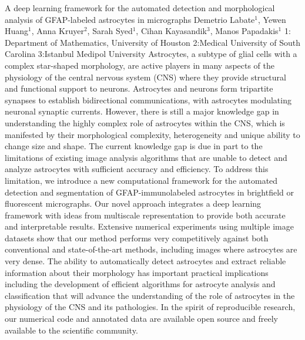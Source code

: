 \vspace{1.5ex}
\abs
{A deep learning framework for the automated detection and morphological analysis of GFAP-labeled astrocytes in micrographs}
{Demetrio Labate$^{1}$, Yewen Huang$^{1}$, Anna Kruyer$^{2}$, Sarah Syed$^{1}$, Cihan Kayasandik$^{3}$, Manos Papadakis$^{1}$}
{1: Department of Mathematics, University of Houston 2:Medical University of South Carolina 3:Istanbul Medipol University}
{Astrocytes, a subtype of glial cells with a complex star-shaped morphology, are active players in many aspects of the physiology of the central nervous system (CNS) where they provide structural and functional support to neurons. Astrocytes and neurons form tripartite synapses to establish bidirectional communications, with astrocytes modulating neuronal synaptic currents. However, there is still a major knowledge gap in understanding the highly complex role of astrocytes within the CNS, which is manifested by their morphological complexity, heterogeneity and unique ability to change size and shape. The current knowledge gap is due in part to the limitations of existing image analysis algorithms that are unable to detect and analyze astrocytes with sufficient accuracy and efficiency.  To address this limitation, we introduce a new computational framework for the automated detection and segmentation of GFAP-immunolabeled astrocytes in brightfield or fluorescent micrographs. Our novel approach integrates a deep learning framework with ideas from multiscale representation to provide both accurate and interpretable results. Extensive numerical experiments using multiple image datasets show that our method performs very competitively against both conventional and state-of-the-art methods, including images where astrocytes are very dense. The ability to automatically detect astrocytes and extract reliable information about their morphology has important practical implications including the development of efficient algorithms for astrocyte analysis and classification that will advance the understanding of the role of astrocytes in the physiology of the CNS and its pathologies.  In the spirit of reproducible research, our numerical code and annotated data are available open source and freely available to the scientific community.}


